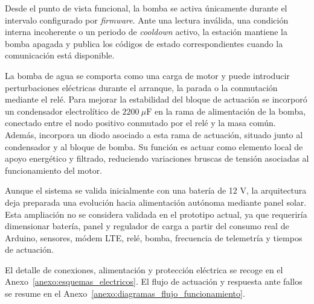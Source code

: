 Desde el punto de vista funcional, la bomba se activa únicamente durante el intervalo configurado por \textit{firmware}. Ante una lectura inválida, una condición interna incoherente o un periodo de \textit{cooldown} activo, la estación mantiene la bomba apagada y publica los códigos de estado correspondientes cuando la comunicación está disponible.

La bomba de agua se comporta como una carga de motor y puede introducir perturbaciones eléctricas durante el arranque, la parada o la conmutación mediante el relé. Para mejorar la estabilidad del bloque de actuación se incorporó un condensador electrolítico de \(2200~\mu\mathrm{F}\) en la rama de alimentación de la bomba, conectado entre el nodo positivo conmutado por el relé y la masa común. Además, incorpora un diodo asociado a esta rama de actuación, situado junto al condensador y al bloque de bomba. Su función es actuar como elemento local de apoyo energético y filtrado, reduciendo variaciones bruscas de tensión asociadas al funcionamiento del motor.

Aunque el sistema se valida inicialmente con una batería de 12 V, la arquitectura deja preparada una evolución hacia alimentación autónoma mediante panel solar. Esta ampliación no se considera validada en el prototipo actual, ya que requeriría dimensionar batería, panel y regulador de carga a partir del consumo real de Arduino, sensores, módem LTE, relé, bomba, frecuencia de telemetría y tiempos de actuación.

El detalle de conexiones, alimentación y protección eléctrica se recoge en el Anexo~\ref{anexo:esquemas_electricos}. El flujo de actuación y respuesta ante fallos se resume en el Anexo~\ref{anexo:diagramas_flujo_funcionamiento}.